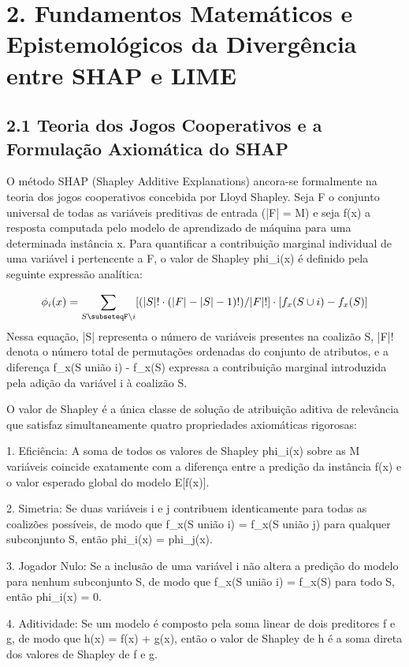 \documentclass[10pt,a4paper,journal]{article}
\begin{document}
\section{2. Fundamentos Matemáticos e Epistemológicos da Divergência entre SHAP e LIME}
\subsection{2.1 Teoria dos Jogos Cooperativos e a Formulação Axiomática do SHAP}
O método SHAP (Shapley Additive Explanations) ancora-se formalmente na teoria dos jogos cooperativos concebida por Lloyd Shapley. Seja F o conjunto universal de todas as variáveis preditivas de entrada (|F| = M) e seja f(x) a resposta computada pelo modelo de aprendizado de máquina para uma determinada instância x. Para quantificar a contribuição marginal individual de uma variável i pertencente a F, o valor de Shapley phi\_i(x) é definido pela seguinte expressão analítica:

\begin{equation}
\phi_{i}(x) = \sum_{S\subseteqF\setminus{i}} [ (|S|! \cdot (|F| - |S| - 1)!) / |F|! ] \cdot [ f_{x}(S \cup {i}) - f_{x}(S) ] \label{eq:1}
\end{equation}
Nessa equação, |S| representa o número de variáveis presentes na coalizão S, |F|! denota o número total de permutações ordenadas do conjunto de atributos, e a diferença f\_x(S união {i}) - f\_x(S) expressa a contribuição marginal introduzida pela adição da variável i à coalizão S.

O valor de Shapley é a única classe de solução de atribuição aditiva de relevância que satisfaz simultaneamente quatro propriedades axiomáticas rigorosas:

1. Eficiência: A soma de todos os valores de Shapley phi\_i(x) sobre as M variáveis coincide exatamente com a diferença entre a predição da instância f(x) e o valor esperado global do modelo E[f(x)].

2. Simetria: Se duas variáveis i e j contribuem identicamente para todas as coalizões possíveis, de modo que f\_x(S união {i}) = f\_x(S união {j}) para qualquer subconjunto S, então phi\_i(x) = phi\_j(x).

3. Jogador Nulo: Se a inclusão de uma variável i não altera a predição do modelo para nenhum subconjunto S, de modo que f\_x(S união {i}) = f\_x(S) para todo S, então phi\_i(x) = 0.

4. Aditividade: Se um modelo é composto pela soma linear de dois preditores f e g, de modo que h(x) = f(x) + g(x), então o valor de Shapley de h é a soma direta dos valores de Shapley de f e g.
\end{document}
